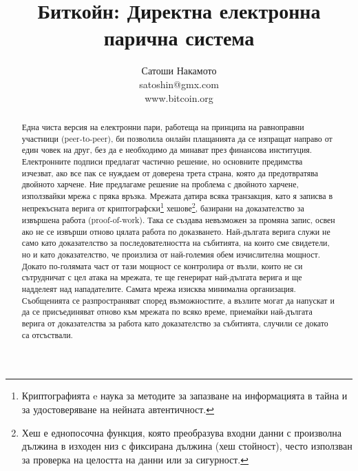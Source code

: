 \documentclass[11pt,a4paper]{article}
\title{\textbf{Биткойн: Директна електронна парична система}}
\author{Сатоши Накамото\\
\small satoshin@gmx.com\\
\small www.bitcoin.org}
\date{}
\begin{document}
\maketitle

\begin{abstract}
Една чиста версия на електронни пари, работеща на принципа на равноправни участници (peer-to-peer), би позволила онлайн плащанията да се изпращат направо от един човек на друг, без да е необходимо да минават през финансова институция. Електронните подписи предлагат частично решение, но основните предимства изчезват, ако все пак се нуждаем от доверена трета страна, която да предотвратява двойното харчене. Ние предлагаме решение на проблема с двойното харчене, използвайки мрежа с пряка връзка. Мрежата датира всяка транзакция, като я записва в непрекъсната верига от криптографски\footnote{Криптографията e наука за методите за запазване на информацията в тайна и за удостоверяване на нейната автентичност.} хешове\footnote{Хеш е еднопосочна функция, която преобразува входни данни с произволна дължина в изходен низ с фиксирана дължина (хеш стойност), често използван за проверка на целостта на данни или за сигурност.}, базирани на доказателство за извършена работа (proof-of-work). Така се създава невъзможен за промяна запис, освен ако не се извърши отново цялата работа по доказването. Най-дългата верига служи не само като доказателство за последователността на събитията, на които сме свидетели, но и като доказателство, че произлиза от най-големия обем изчислителна мощност. Докато по-голямата част от тази мощност се контролира от възли, които не си сътрудничат с цел атака на мрежата, те ще генерират най-дългата верига и ще надделеят над нападателите. Самата мрежа изисква минимална организация. Съобщенията се разпространяват според възможностите, а възлите могат да напускат и да се присъединяват отново към мрежата по всяко време, приемайки най-дългата верига от доказателства за работа като доказателство за събитията, случили се докато са отсъствали.
\end{abstract}
\end{document}
